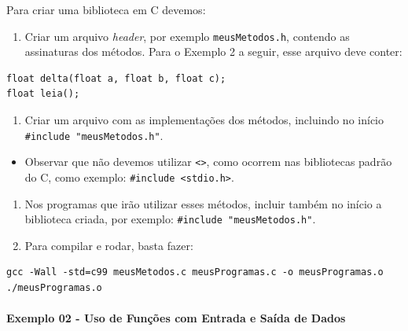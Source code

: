 \documentclass[12pt,a4paper]{article}
\providecommand{\tightlist}{%
      \setlength{\itemsep}{0pt}\setlength{\parskip}{0pt}}
\begin{document}
    Para criar uma biblioteca em C devemos:

\begin{enumerate}
\def\labelenumi{\arabic{enumi}.}
\tightlist
\item
  Criar um arquivo \emph{header}, por exemplo \texttt{meusMetodos.h},
  contendo as assinaturas dos métodos. Para o Exemplo 2 a seguir, esse
  arquivo deve conter:
\end{enumerate}

\begin{verbatim}
float delta(float a, float b, float c);
float leia();
\end{verbatim}

\begin{enumerate}
\def\labelenumi{\arabic{enumi}.}
\setcounter{enumi}{1}
\tightlist
\item
  Criar um arquivo com as implementações dos métodos, incluindo no
  início \texttt{\#include\ "meusMetodos.h"}.
\end{enumerate}

\begin{itemize}
\tightlist
\item
  Observar que não devemos utilizar \texttt{\textless{}\textgreater{}},
  como ocorrem nas bibliotecas padrão do C, como exemplo:
  \texttt{\#include\ \textless{}stdio.h\textgreater{}}.
\end{itemize}

\begin{enumerate}
\def\labelenumi{\arabic{enumi}.}
\setcounter{enumi}{2}
\tightlist
\item
  Nos programas que irão utilizar esses métodos, incluir também no
  início a biblioteca criada, por exemplo:
  \texttt{\#include\ "meusMetodos.h"}.
\item
  Para compilar e rodar, basta fazer:
\end{enumerate}

\begin{verbatim}
gcc -Wall -std=c99 meusMetodos.c meusProgramas.c -o meusProgramas.o
./meusProgramas.o
\end{verbatim}

    \hypertarget{exemplo-02---uso-de-funuxe7uxf5es-com-entrada-e-sauxedda-de-dados}{%
\paragraph{Exemplo 02 - Uso de Funções com Entrada e Saída de
Dados}\label{exemplo-02---uso-de-funuxe7uxf5es-com-entrada-e-sauxedda-de-dados}}
\end{document}

